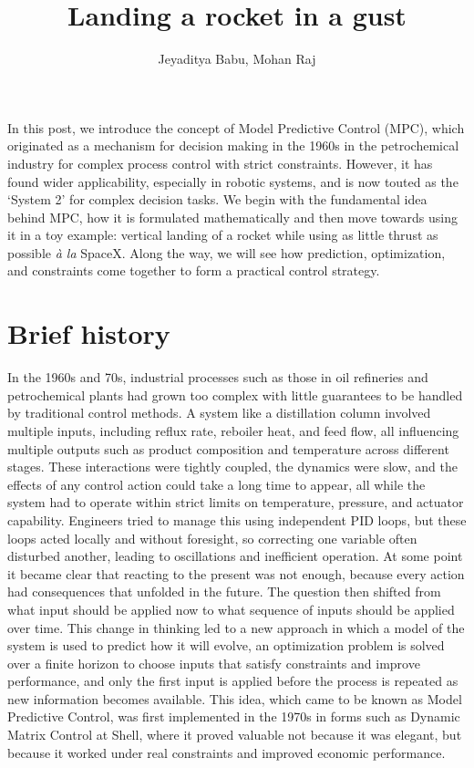 \documentclass[12pt]{article}
\title{Landing a rocket in a gust}
\author{Jeyaditya Babu, Mohan Raj}
\date{}
\begin{document}
\maketitle

In this post, we introduce the concept of Model Predictive Control (MPC), which originated as a mechanism for decision making in the 1960s in the petrochemical industry for complex process control with strict constraints. However, it has found wider applicability, especially in robotic systems, and is now touted as the `System 2' for complex decision tasks. We begin with the fundamental idea behind MPC, how it is formulated mathematically and then move towards using it in a toy example: vertical landing of a rocket while using as little thrust as possible \textit{\`a la} SpaceX. Along the way, we will see how prediction, optimization, and constraints come together to form a practical control strategy.

\section*{Brief history}
In the 1960s and 70s, industrial processes such as those in oil refineries and petrochemical plants had grown too complex with little guarantees to be handled by traditional control methods. A system like a distillation column involved multiple inputs, including reflux rate, reboiler heat, and feed flow, all influencing multiple outputs such as product composition and temperature across different stages. These interactions were tightly coupled, the dynamics were slow, and the effects of any control action could take a long time to appear, all while the system had to operate within strict limits on temperature, pressure, and actuator capability. Engineers tried to manage this using independent PID loops, but these loops acted locally and without foresight, so correcting one variable often disturbed another, leading to oscillations and inefficient operation. At some point it became clear that reacting to the present was not enough, because every action had consequences that unfolded in the future. The question then shifted from what input should be applied now to what sequence of inputs should be applied over time. This change in thinking led to a new approach in which a model of the system is used to predict how it will evolve, an optimization problem is solved over a finite horizon to choose inputs that satisfy constraints and improve performance, and only the first input is applied before the process is repeated as new information becomes available. This idea, which came to be known as Model Predictive Control, was first implemented in the 1970s in forms such as Dynamic Matrix Control at Shell, where it proved valuable not because it was elegant, but because it worked under real constraints and improved economic performance. 
\end{document}
